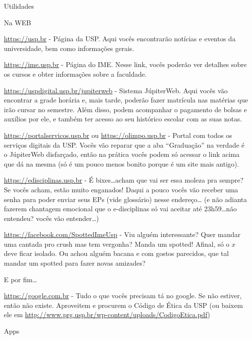 \begin{secao}{Utilidades}

\begin{subsecao}{Na WEB}

\url{https://usp.br} - Página da USP. Aqui vocês encontrarão notícias e eventos da
universidade, bem como informações gerais.

\url{https://ime.usp.br} - Página do IME. Nesse link, vocês poderão ver detalhes sobre
os cursos e obter informações sobre a faculdade.

\url{https://uspdigital.usp.br/jupiterweb} - Sistema JúpiterWeb. Aqui vocês vão
encontrar a grade horária e, mais tarde, poderão fazer matrícula nas matérias
que irão cursar no semestre. Além disso, podem acompanhar o pagamento de
bolsas e auxílios por ele, e também ter acesso ao seu histórico escolar com
as suas notas.

\url{https://portalservicos.usp.br} ou \url{https://olimpo.usp.br} - Portal com todos os
serviços digitais da USP. Vocês vão reparar que a aba ``Graduação'' na verdade
é o JúpiterWeb disfarçado, então na prática vocês podem só acessar o link acima
que dá na mesma (só é um pouco menos bonito porque é um site mais antigo).

\url{https://edisciplinas.usp.br} - É bixes\dots acham que vai ser essa moleza pra
sempre? Se vocês acham, estão muito enganados! Daqui a pouco vocês vão receber
uma senha para poder enviar seus EPs (vide glossário) nesse endereço\dots
(e não adianta fazerem chantagem emocional que o e-disciplinas só vai aceitar
até 23h59\dots não entendeu? vocês vão entender\dots)

\url{https://facebook.com/SpottedImeUsp} - Viu alguém interessante? Quer mandar uma
cantada pro crush mas tem vergonha? Manda um spotted! Afinal, só o $x$ deve
ficar isolado. Ou achou alguém bacana e com gostos parecidos, que tal mandar um
spotted para fazer novas amizades?


E por fim\dots

\url{https://google.com.br} - Tudo o que vocês precisam tá no google. Se não
estiver, então não existe. Aproveitem e procurem o Código de Ética da USP (ou
baixem ele em \url{http://www.prg.usp.br/wp-content/uploads/CodigoEtica.pdf})

\end{subsecao}

\begin{subsecao}{Apps}
	

\end{subsecao}
\end{secao}
